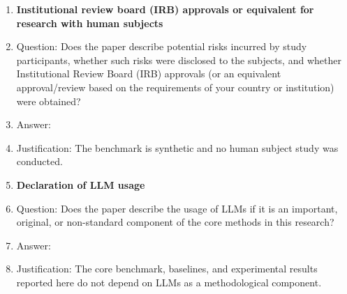 \begin{enumerate}
\item {\bf Institutional review board (IRB) approvals or equivalent for research with human subjects}
    \item[] Question: Does the paper describe potential risks incurred by study participants, whether such risks were disclosed to the subjects, and whether Institutional Review Board (IRB) approvals (or an equivalent approval/review based on the requirements of your country or institution) were obtained?
    \item[] Answer: \answerNA{}
    \item[] Justification: The benchmark is synthetic and no human subject study was conducted.

\item {\bf Declaration of LLM usage}
    \item[] Question: Does the paper describe the usage of LLMs if it is an important, original, or non-standard component of the core methods in this research?
    \item[] Answer: \answerNA{}
    \item[] Justification: The core benchmark, baselines, and experimental results reported here do not depend on LLMs as a methodological component.

\end{enumerate}
